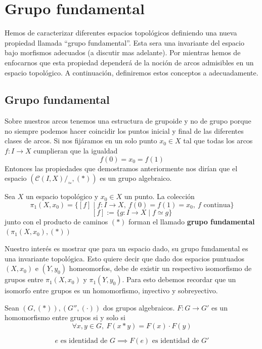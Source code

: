 \section{Grupo fundamental}
Hemos de caracterizar diferentes espacios topológicos definiendo una
nueva propiedad llamada ``grupo fundamental''. Esta sera una invariante
del espacio bajo morfismos adecuados (a discutir mas adelante). Por
mientras hemos de enfocarnos que esta propiedad dependerá de la noción
de arcos admisibles en un espacio topológico. A continuación,
definiremos estos conceptos a adecuadamente.

{
\newcommand{\homRelAlt}{\stackrel{.}{\simeq}}



\subsection{Grupo fundamental}
Sobre nuestros arcos tenemos una estructura de grupoide y no de grupo
porque no siempre podemos hacer coincidir los puntos inicial y final de
las diferentes clases de arcos. Si nos fijáramos en un solo punto \(x_0
\in X\) tal que todas los arcos \(f : I \to X\) cumplieran que la igualdad
\[ f(0) = x_0 = f (1) \]
Entonces las propiedades que demostramos anteriormente nos dirían que el
espacio \((\mathcal C \left( I , X \right) / _\simeq , \left( *
\right))\) es un grupo algebraico.
\begin{definicion}
  Sea \(X\) un espacio topológico y \(x_0 \in X\) un punto. La colección
  \[ \pi_1 (X,x_0) = \{ [f] \mid f : I \to X
     ,\ f(0)=f(1)=x_0,\ f \text{ continua}\}\]
  \[ [f] := \{ g : I \to X \mid f \simeq g\}\]
  junto con el producto de caminos \((*)\) forman el llamado
  \textbf{grupo fundamental} \((\pi_1(X,x_0), (*))\)
\end{definicion}

Nuestro interés es mostrar que para un espacio dado, su grupo
fundamental es una invariante topológica. Esto quiere decir que dado dos
espacios puntuados \((X,x_0)\) e \((Y,y_0)\) homeomorfos, debe de
existir un respectivo isomorfismo de grupos entre \(\pi_1(X,x_0)\) y
\(\pi_1(Y,y_0)\). Para esto debemos recordar que un isomorfo entre
grupos es un homomorfismo, inyectivo y sobreyectivo.
\begin{definicion}[Homomorfismo] \label{def:homomorfismo}
  Sean \((G,(*)), (G'', (\cdot))\) dos grupos algebraicos. \(F : G \to
  G'\) es un homomorfismo entre grupos si y solo si
  \[ \forall x,y \in G,\ F (x * y) = F(x) \cdot F(y)\]
\end{definicion}
\begin{observacion}
  \[ e \text{ es identidad de } G \implies F(e) \text { es identidad de } G' \]
\end{observacion}

}
